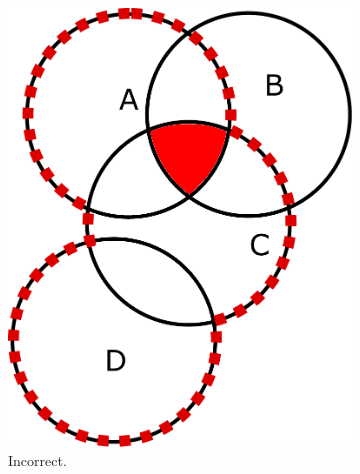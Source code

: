 \begin{figure}[htb]
	\centering
	\begin{subfigure}[b]{0.25\linewidth}
		\includegraphics[width=\textwidth]{figures/wrong_part.pdf}	
		\caption{Incorrect.}
	\end{subfigure}
	~
	\begin{subfigure}[b]{0.25\linewidth}

\end{subfigure}
\end{figure}
